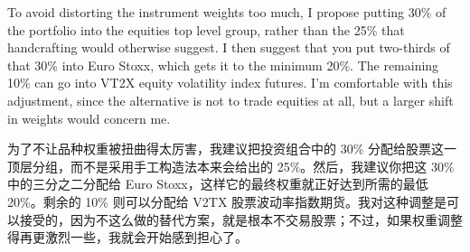 \bipairgap

\begin{englishblock} To avoid distorting the instrument weights too much, I propose putting 30\% of the portfolio into the equities top level group, rather than the 25\% that handcrafting would otherwise suggest. I then suggest that you put two-thirds of that 30\% into Euro Stoxx, which gets it to the minimum 20\%. The remaining 10\% can go into VT2X equity volatility index futures. I'm comfortable with this adjustment, since the alternative is not to trade equities at all, but a larger shift in weights would concern me. \end{englishblock}

\begin{chineseblock}为了不让品种权重被扭曲得太厉害，我建议把投资组合中的 30\% 分配给股票这一顶层分组，而不是采用手工构造法本来会给出的 25\%。然后，我建议你把这 30\% 中的三分之二分配给 Euro Stoxx，这样它的最终权重就正好达到所需的最低 20\%。剩余的 10\% 则可以分配给 V2TX 股票波动率指数期货。我对这种调整是可以接受的，因为不这么做的替代方案，就是根本不交易股票；不过，如果权重调整得再更激烈一些，我就会开始感到担心了。\end{chineseblock}

\begin{bilingualtableblock} \begingroup \scriptsize \setlength{\tabcolsep}{3pt} \renewcommand{\arraystretch}{1.08}
\par\noindent{}\endgroup \end{bilingualtableblock}

